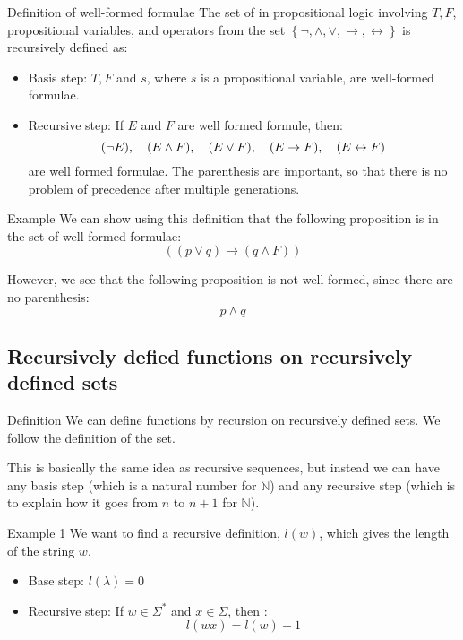 \documentclass[a4paper]{article}
\begin{document}
\begin{parag}{Definition of well-formed formulae}
    The set of  in propositional logic involving $T, F$, propositional variables, and operators from the set $\left\{\lnot, \land, \lor, \to, \leftrightarrow\right\}$ is recursively defined as:
    \begin{itemize}
        \item Basis step: $T, F$ and $s$, where $s$ is a propositional variable, are well-formed formulae.
        \item Recursive step: If $E$ and $F$ are well formed formule, then: 
            \[\left(\lnot E\right), \mathspace \left(E \land F\right), \mathspace\left(E \lor F\right), \mathspace \left(E \to F\right), \mathspace\left(E \leftrightarrow F\right)\]
        are well formed formulae. The parenthesis are important, so that there is no problem of precedence after multiple generations.
    \end{itemize}
    
    \begin{subparag}{Example}
        We can show using this definition that the following proposition is in the set of well-formed formulae: 
    \[\left(\left(p \lor q\right) \to \left(q \land F\right)\right)\]
        
        However, we see that the following proposition is not well formed, since there are no parenthesis:
        \[p \land q\]
    \end{subparag}
\end{parag}

\subsection{Recursively defied functions on recursively defined sets}
\begin{parag}{Definition}
    We can define functions by recursion on recursively defined sets. We follow the definition of the set.

    This is basically the same idea as recursive sequences, but instead we can have any basis step (which is a natural number for $\mathbb{N}$) and any recursive step (which is to explain how it goes from $n$ to $n+1$ for $\mathbb{N}$).
\end{parag}


\begin{parag}{Example 1}
    We want to find a recursive definition, $l\left(w\right)$, which gives the length of the string $w$.
    \begin{itemize}
        \item Base step: $l\left(\lambda\right) = 0$ 
        \item Recursive step: If $w \in \Sigma^*$ and $x \in \Sigma$, then : 
            \[l\left(w x\right)= l\left(w\right) + 1\]
    \end{itemize}
\end{parag}
\end{document}
